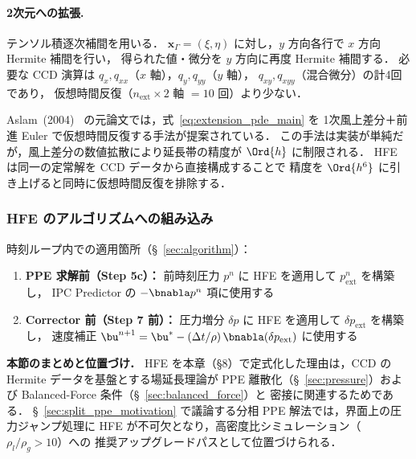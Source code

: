 \paragraph{2次元への拡張.}
テンソル積逐次補間を用いる．
$\bm{x}_\Gamma = (\xi, \eta)$ に対し，$y$ 方向各行で $x$ 方向 Hermite 補間を行い，
得られた値・微分を $y$ 方向に再度 Hermite 補間する．
必要な CCD 演算は $q_x, q_{xx}$（$x$ 軸），$q_y, q_{yy}$（$y$ 軸），
$q_{xy}, q_{xyy}$（混合微分）の計4回であり，
仮想時間反復（$n_\mathrm{ext} \times 2$ 軸 $= 10$ 回）より少ない．

\begin{tcolorbox}[defbox, title={補足：仮想時間前進による離散化との比較}]
Aslam~(2004)~\cite{Aslam2004} の元論文では，式~\eqref{eq:extension_pde_main} を
1次風上差分＋前進 Euler で仮想時間反復する手法が提案されている．
この手法は実装が単純だが，風上差分の数値拡散により延長帯の精度が $\Ord{h}$ に制限される．
HFE は同一の定常解を CCD データから直接構成することで
精度を $\Ord{h^6}$ に引き上げると同時に仮想時間反復を排除する．
\end{tcolorbox}

\subsubsection{HFE のアルゴリズムへの組み込み}

時刻ループ内での適用箇所（§~\ref{sec:algorithm}）：
\begin{enumerate}
  \item \textbf{PPE 求解前（Step 5c）：} 前時刻圧力 $p^n$ に HFE を適用して $p^n_{\mathrm{ext}}$ を構築し，
        IPC Predictor の $-\bnabla p^n$ 項に使用する
  \item \textbf{Corrector 前（Step 7 前）：} 圧力増分 $\delta p$ に HFE を適用して $\delta p_{\mathrm{ext}}$ を構築し，
        速度補正 $\bu^{n+1} = \bu^* - (\Delta t/\rho)\,\bnabla(\delta p_{\mathrm{ext}})$ に使用する
\end{enumerate}

\medskip
\noindent\textbf{本節のまとめと位置づけ．}
HFE を本章（§8）で定式化した理由は，CCD の Hermite データを基盤とする場延長理論が
PPE 離散化（§~\ref{sec:pressure}）および Balanced-Force 条件（§~\ref{sec:balanced_force}）と
密接に関連するためである．
§~\ref{sec:split_ppe_motivation} で議論する分相 PPE 解法では，界面上の圧力ジャンプ処理に
HFE が不可欠となり，高密度比シミュレーション（$\rho_l/\rho_g > 10$）への
推奨アップグレードパスとして位置づけられる．

\label{eq:gfm_rhs_correction}%
\label{eq:gfm_ccd_div}%

